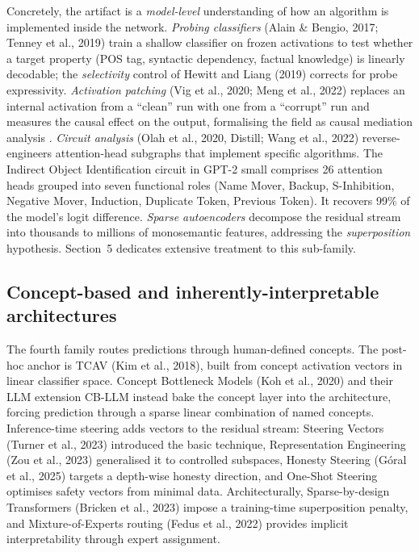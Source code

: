 \documentclass{article}
\begin{document}
Concretely, the artifact is a \emph{model-level} understanding of how an algorithm is implemented inside the network. \emph{Probing classifiers} (Alain \& Bengio, 2017; Tenney et al., 2019) train a shallow classifier on frozen activations to test whether a target property (POS tag, syntactic dependency, factual knowledge) is linearly decodable; the \emph{selectivity} control of Hewitt and Liang (2019) corrects for probe expressivity. \emph{Activation patching} (Vig et al., 2020; Meng et al., 2022) replaces an internal activation from a ``clean'' run with one from a ``corrupt'' run and measures the causal effect on the output, formalising the field as causal mediation analysis \citep{mueller2024thequestfortherigh}. \emph{Circuit analysis} (Olah et al., 2020, Distill; Wang et al., 2022) reverse-engineers attention-head subgraphs that implement specific algorithms. The Indirect Object Identification circuit in GPT-2 small comprises 26 attention heads grouped into seven functional roles (Name Mover, Backup, S-Inhibition, Negative Mover, Induction, Duplicate Token, Previous Token). It recovers 99\% of the model's logit difference. \emph{Sparse autoencoders} \citep{cunningham2023sparseautoencoders} decompose the residual stream into thousands to millions of monosemantic features, addressing the \emph{superposition} hypothesis. Section~5 dedicates extensive treatment to this sub-family.

\subsection{Concept-based and inherently-interpretable architectures}\label{concept-based-and-inherently-interpretable-architectures}

The fourth family routes predictions through human-defined concepts. The post-hoc anchor is TCAV (Kim et al., 2018), built from concept activation vectors in linear classifier space. Concept Bottleneck Models (Koh et al., 2020) and their LLM extension CB-LLM \citep{sun2024craftinglargelangu} instead bake the concept layer into the architecture, forcing prediction through a sparse linear combination of named concepts. Inference-time steering adds vectors to the residual stream: Steering Vectors (Turner et al., 2023) introduced the basic technique, Representation Engineering (Zou et al., 2023) generalised it to controlled subspaces, Honesty Steering (Góral et al., 2025) targets a depth-wise honesty direction, and One-Shot Steering \citep{dunefsky2025oneshotoptimizedst} optimises safety vectors from minimal data. Architecturally, Sparse-by-design Transformers (Bricken et al., 2023) impose a training-time superposition penalty, and Mixture-of-Experts routing (Fedus et al., 2022) provides implicit interpretability through expert assignment.
\end{document}
